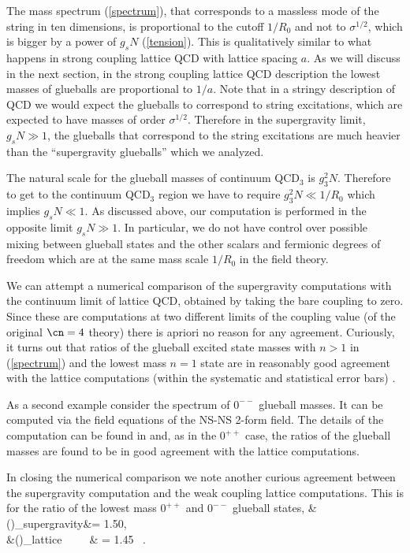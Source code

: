 The mass spectrum (\ref{spectrum}), that corresponds to a massless
mode of the string in ten dimensions, is proportional to the cutoff
$1/R_0$ and not to $\sigma^{1/2}$, which is bigger by a power of $g_s
N$ (\ref{tension}).  This is qualitatively similar to what happens in
strong coupling lattice QCD with lattice spacing $a$. As we will
discuss in the next section, in the strong coupling lattice QCD
description the lowest masses of glueballs are proportional to $1/a$.
Note that in a stringy description of QCD we would expect the
glueballs to correspond to
string excitations, which  are expected to have masses of order
$\sigma^{1/2}$. Therefore in the supergravity limit, $g_sN \gg 1$, the
glueballs that correspond to the string excitations are much heavier
than the ``supergravity glueballs'' which we analyzed.

The natural scale for the glueball masses of continuum QCD$_3$ is  
$g_3^2N$. Therefore to get to the continuum QCD$_3$ region we have to
require $g_3^2N \ll 1/R_0$ which implies $g_s N \ll 1$.
As discussed above, our computation is performed in
the opposite limit $g_s N \gg 1$.
In particular, we do not have control 
over possible mixing between glueball states
and the other scalars and fermionic degrees of freedom which are 
at the same mass scale $1/R_0$ in the field theory.   


We can attempt a numerical comparison of the supergravity computations
with the continuum limit of lattice QCD, obtained by taking the bare
coupling to zero. Since these are computations at two different limits
of the coupling value (of the original $\cn=4$ theory) there is
apriori no reason for any agreement.  Curiously, it turns out that
ratios of the glueball excited state masses with $n > 1$ in
(\ref{spectrum}) and the lowest mass $n=1$ state are in reasonably
good agreement with the lattice computations (within the systematic
and statistical error bars)
\cite{Csaki:1998gm,Teper:1998sg}. 


As a second example consider the spectrum of $0^{--}$ glueball masses.
It can be computed via the field equations of the NS-NS
2-form field. 
The details of the computation can be found in \cite{Csaki:1998gm} and,
as in the $0^{++}$ case, the
ratios of the glueball masses 
are found to be in good agreement
with the lattice computations. 

In closing the numerical comparison we note another curious agreement
between the supergravity computation and the weak coupling lattice
computations. This is for the
ratio of the lowest mass
$0^{++}$ and $0^{--}$ glueball
states,
\beqar
&\left(\right)_{{\rm supergravity}}&= 1.50, 
\nonumber\\
&\left(\right)_{{\rm lattice~~~~~}}& =
 1.45 \ .
\eeqar

